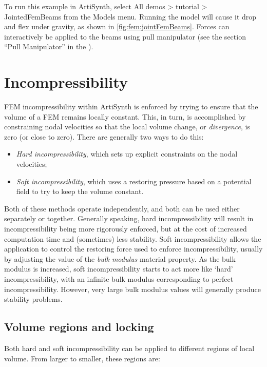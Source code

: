 To run this example in ArtiSynth, select {\sf All demos > tutorial >
JointedFemBeams} from the {\sf Models} menu. Running the model will
cause it drop and flex under gravity, as shown in 
\ref{fig:fem:jointFemBeams}. Forces can interactively
be applied to the beams using
pull manipulator 
(see the section ``Pull Manipulator'' in the
).

\section{Incompressibility}

FEM incompressibility within ArtiSynth is enforced by trying to ensure
that the volume of a FEM remains locally constant. This, in turn, is
accomplished by constraining nodal velocities so that the local volume change,
or \emph{divergence}, is zero (or close to zero). There are generally two
ways to do this:

\begin{itemize}
\item {\it Hard incompressibility}, which sets up explicit constraints on the
nodal velocities;
\item {\it Soft incompressibility}, which uses a restoring pressure based on a
potential field to try to keep the volume constant.
\end{itemize}

Both of these methods operate independently, and both can be used
either separately or together. Generally speaking, hard incompressibility
will result in incompressibility being more rigorously enforced, but
at the cost of increased computation time and (sometimes) less
stability. Soft incompressibility allows the application to control
the restoring force used to enforce incompressibility, usually by
adjusting the value of the \emph{bulk modulus} material property.  As
the bulk modulus is increased, soft incompressibility starts to act
more like `hard' incompressibility, with an infinite bulk modulus
corresponding to perfect incompressibility. However, very large bulk
modulus values will generally produce stability problems.

\subsection{Volume regions and locking}
\label{VolumeRegions:sec}

Both hard and soft incompressibility can be applied to different
regions of local volume. From larger to smaller, these regions are:


